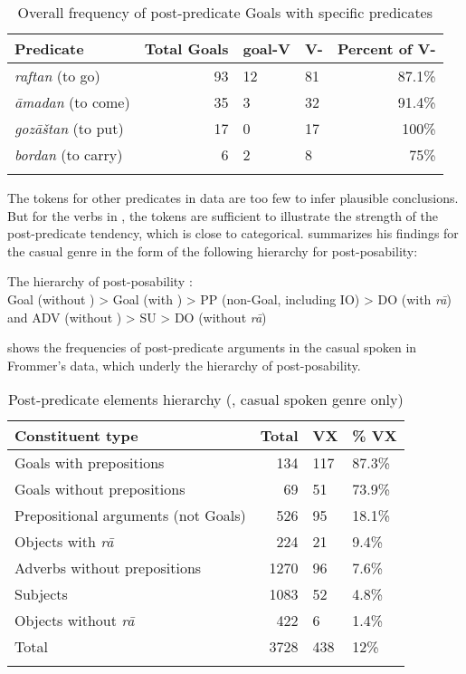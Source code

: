 \documentclass[output=paper,colorlinks,citecolor=brown,draftmode]{langscibook}
\begin{document}
\begin{table}
 \begin{tabularx}{\textwidth}{lrYYr}
\lsptoprule
Predicate & Total Goals & goal-V & V- & Percent of V- \\
\midrule
\textit{raftan} (to go) & 93 & 12 & 81 & 87.1\% \\
\textit{āmadan} (to come) & 35 & 3 & 32 & 91.4\% \\
\textit{gozāštan} (to put) & 17 & 0 & 17 & 100\% \\
\textit{bordan} (to carry) & 6 & 2 & 8 & 75\% \\
\lspbottomrule
 \end{tabularx}
 \caption{Overall frequency of post-predicate Goals with specific predicates \citep[133]{frommer_post-verbal_1981}}
 \label{Persian:tab:3}
\end{table}

The tokens for other predicates in  data are too few to infer plausible conclusions. But for the verbs in , the tokens are sufficient to illustrate the strength of the post-predicate tendency, which is close to categorical. \citet[172]{frommer_post-verbal_1981} summarizes his findings for the casual genre in the form of the following hierarchy for post-posability:

\ea 
The hierarchy of post-posability \citep[172]{frommer_post-verbal_1981}: \\
Goal (without ) > Goal (with ) > PP (non-Goal, including IO) > DO (with \textit{rā}) and ADV (without ) > SU > DO (without \textit{rā})
\z

 shows the frequencies of post-predicate arguments in the casual spoken  in Frommer's data, which underly the hierarchy of post-posability.

\begin{table}
 \begin{tabularx}{\textwidth}{lrYY}
\lsptoprule
Constituent type & Total & VX & \% VX \\
\midrule
Goals with prepositions & 134 & 117 & 87.3\% \\
Goals without prepositions & 69 & 51 & 73.9\% \\
Prepositional arguments (not Goals) & 526 & 95 & 18.1\% \\
Objects with \textit{rā} & 224 & 21 & 9.4\% \\
Adverbs without prepositions & 1270 & 96 & 7.6\% \\
Subjects & 1083 & 52 & 4.8\% \\
Objects without \textit{rā} & 422 & 6 & 1.4\% \\
Total & 3728 & 438 & 12\% \\
\lspbottomrule
 \end{tabularx}
 \caption{Post-predicate elements hierarchy (\citealt[172]{frommer_post-verbal_1981}, casual spoken genre only)}
 \label{Persian:tab:4}
\end{table}
\end{document}
